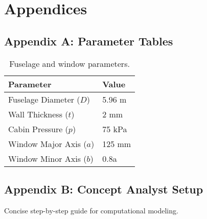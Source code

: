 \documentclass[a4paper,11pt]{article}
\begin{document}
\newpage

\section*{Appendices}
\subsection*{Appendix A: Parameter Tables}
\begin{table}[H]
    \centering
    \begin{tabular}{@{}ll@{}}
        \toprule
        Parameter & Value \\
        \midrule
        Fuselage Diameter (\(D\)) & 5.96 m \\
        Wall Thickness (\(t\)) & 2 mm \\
        Cabin Pressure (\(p\)) & 75 kPa \\
        Window Major Axis (\(a\)) & 125 mm \\
        Window Minor Axis (\(b\)) & 0.8a \\
        \bottomrule
    \end{tabular}
    \caption{Fuselage and window parameters.}
\end{table}

\subsection*{Appendix B: Concept Analyst Setup}
Concise step-by-step guide for computational modeling.
\end{document}
